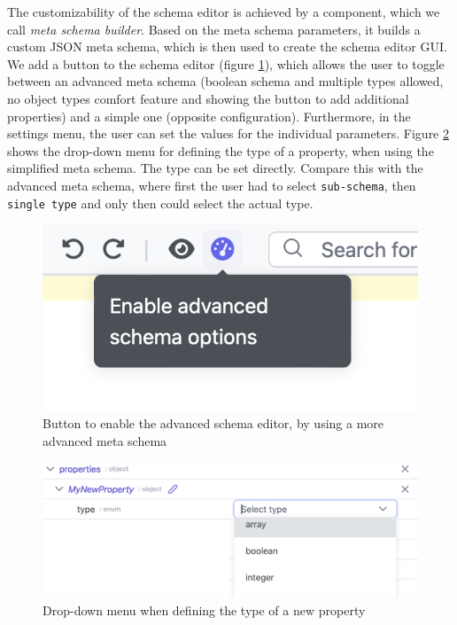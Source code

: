 The customizability of the schema editor is achieved by a component, which we call \textit{meta schema builder}.
Based on the meta schema parameters, it builds a custom JSON meta schema, which is then used to create the schema editor GUI.
We add a button to the schema editor (figure \ref{fig:schema_editor_advanced_mode_button}), which allows the user to toggle between an advanced meta schema (boolean schema and multiple types allowed, no object types comfort feature and showing the button to add additional properties) and a simple one (opposite configuration).
Furthermore, in the settings menu, the user can set the values for the individual parameters.
Figure \ref{fig:schema_editor_simple_choose_type} shows the drop-down menu for defining the type of a property, when using the simplified meta schema.
The type can be set directly.
Compare this with the advanced meta schema, where first the user had to select \texttt{sub-schema}, then \texttt{single type} and only then could select the actual type.

\begin{figure}[!t]
    \centering
    \includegraphics[width=0.5\columnwidth]{figures/schema_editor_advanced_mode_button}
    \caption{Button to enable the advanced schema editor, by using a more advanced meta schema}
    \label{fig:schema_editor_advanced_mode_button}
\end{figure}

\begin{figure}[!t]
    \centering
    \includegraphics[width=\columnwidth]{figures/schema_editor_simple_choose_type}
    \caption{Drop-down menu when defining the type of a new property}
    \label{fig:schema_editor_simple_choose_type}
\end{figure}




